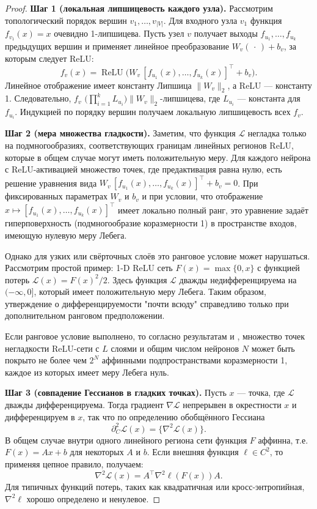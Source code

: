 \documentclass[11pt]{article}
\begin{document}
\begin{proof}
  \textbf{Шаг 1 (локальная липшицевость каждого узла).}
  Рассмотрим топологический порядок вершин $v_1,\dots,v_{|V|}$.
  Для входного узла $v_1$ функция~$f_{v_1}(x)=x$ очевидно 1-липшицева.
  Пусть узел $v$ получает выходы $f_{u_1},\dots,f_{u_k}$ предыдущих вершин
  и применяет линейное преобразование $W_v(\,\cdot\,)+b_v$, за которым следует ReLU:
  \[
    f_v(x)=\operatorname{ReLU}\!\bigl(W_v\,[f_{u_1}(x),\dots,f_{u_k}(x)]^{\!\top}+b_v\bigr).
  \]
  Линейное отображение имеет константу Липшица $\|W_v\|_2$, а ReLU — константу 1.
  Следовательно, $f_v$ $\bigl(\prod_{i=1}^k L_{u_i}\bigr)\|W_v\|_2$-липшицева,
  где $L_{u_i}$ — константа для $f_{u_i}$.
  Индукцией по порядку вершин получаем локальную липшицевость всех $f_v$.

  \medskip
  \textbf{Шаг 2 (мера множества гладкости).}
  Заметим, что функция $\mathcal L$ негладка только на подмногообразиях, соответствующих границам линейных
  регионов ReLU, которые в общем случае могут иметь положительную меру. Для каждого нейрона с
  ReLU-активацией множество точек, где предактивация равна нулю, есть решение уравнения вида
  $W_v\,[f_{u_1}(x),\dots,f_{u_k}(x)]^{\!\top}+b_v = 0$. При фиксированных параметрах $W_v$ и $b_v$ и при
  условии, что отображение $x \mapsto [f_{u_1}(x),\dots,f_{u_k}(x)]^{\!\top}$ имеет локально полный ранг,
  это уравнение задаёт гиперповерхность (подмногообразие коразмерности 1) в пространстве входов, имеющую
  нулевую меру Лебега.

  Однако для узких или свёрточных слоёв это ранговое условие может нарушаться. Рассмотрим простой пример:
  1-D ReLU сеть $F(x)=\max\{0,x\}$ с функцией потерь $\mathcal L(x)=F(x)^2/2$. Здесь функция $\mathcal L$
  дважды недифференцируема на $(-\infty,0]$, который имеет положительную меру Лебега. Таким образом,
  утверждение о дифференцируемости "почти всюду" справедливо только при дополнительном ранговом предположении.

  Если ранговое условие выполнено, то согласно результатам \citet{hanin2019complexity} и
  \citet{serra2018bounding}, множество точек
  негладкости ReLU-сети с $L$ слоями и общим числом нейронов $N$ может быть покрыто не более чем $2^N$
  аффинными подпространствами коразмерности 1, каждое из которых имеет меру Лебега нуль.

  \medskip
  \textbf{Шаг 3 (совпадение Гессианов в гладких точках).}
  Пусть $x$ — точка, где $\mathcal L$ дважды дифференцируема.
  Тогда градиент $\nabla\mathcal L$ непрерывен в окрестности $x$ и дифференцируем в $x$,
  так что по определению обобщённого Гессиана
  \[
    \partial_C^{2}\mathcal L(x)=\bigl\{\nabla^{2}\mathcal L(x)\bigr\}.
  \]
  В общем случае внутри одного линейного региона сети функция $F$ аффинна, т.е. $F(x) = Ax + b$ для некоторых
  $A$ и $b$. Если внешняя функция $\ell \in C^2$, то применяя цепное правило, получаем:
  \[
    \nabla^2 \mathcal L(x) = A^\top \nabla^2 \ell(F(x)) A.
  \]
  Для типичных функций потерь, таких как квадратичная или кросс-энтропийная, $\nabla^2 \ell$ хорошо
  определено и ненулевое.


\end{proof}
\end{document}
